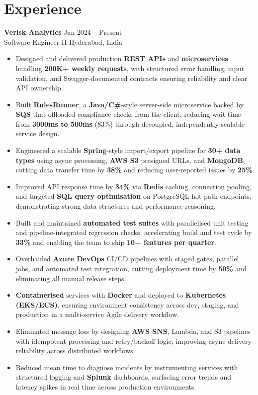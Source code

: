 \documentclass[10pt,letterpaper]{article}
\newcommand{\resumeSubheading}[4]{%
  \textbf{#1} \hfill #2 \\
  #3 \hfill #4 \\
}
\begin{document}
\section*{Experience}
\resumeSubheading{Verisk Analytics}{Jan 2024 -- Present}{Software Engineer II}{Hyderabad, India}
\begin{itemize}
    \item Designed and delivered production \textbf{REST APIs} and \textbf{microservices} handling \textbf{200K+ weekly requests}, with structured error handling, input validation, and Swagger-documented contracts ensuring reliability and clear API ownership.
    \item Built \textbf{RulesRunner}, a \textbf{Java/C\#}-style server-side microservice backed by \textbf{SQS} that offloaded compliance checks from the client, reducing wait time from \textbf{3000ms to 500ms} (83\%) through decoupled, independently scalable service design.
    \item Engineered a scalable \textbf{Spring}-style import/export pipeline for \textbf{30+ data types} using async processing, \textbf{AWS S3} presigned URLs, and \textbf{MongoDB}, cutting data transfer time by \textbf{38\%} and reducing user-reported issues by \textbf{25\%}.
    \item Improved API response time by \textbf{34\%} via \textbf{Redis} caching, connection pooling, and targeted \textbf{SQL query optimisation} on PostgreSQL hot-path endpoints, demonstrating strong data structures and performance reasoning.
    \item Built and maintained \textbf{automated test suites} with parallelised unit testing and pipeline-integrated regression checks, accelerating build and test cycle by \textbf{33\%} and enabling the team to ship \textbf{10+ features per quarter}.
    \item Overhauled \textbf{Azure DevOps} CI/CD pipelines with staged gates, parallel jobs, and automated test integration, cutting deployment time by \textbf{50\%} and eliminating all manual release steps.
    \item \textbf{Containerised} services with \textbf{Docker} and deployed to \textbf{Kubernetes (EKS/ECS)}, ensuring environment consistency across dev, staging, and production in a multi-service Agile delivery workflow.
    \item Eliminated message loss by designing \textbf{AWS SNS}, Lambda, and S3 pipelines with idempotent processing and retry/backoff logic, improving async delivery reliability across distributed workflows.
    \item Reduced mean time to diagnose incidents by instrumenting services with structured logging and \textbf{Splunk} dashboards, surfacing error trends and latency spikes in real time across production environments.
\end{itemize}
\end{document}

